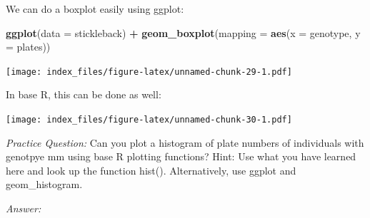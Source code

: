 \documentclass[]{article}
\newenvironment{Shaded}{\begin{snugshade}}{\end{snugshade}}
\newcommand{\DataTypeTok}[1]{\textcolor[rgb]{0.13,0.29,0.53}{#1}}
\newcommand{\KeywordTok}[1]{\textcolor[rgb]{0.13,0.29,0.53}{\textbf{#1}}}
\newcommand{\NormalTok}[1]{#1}
\newcommand{\OperatorTok}[1]{\textcolor[rgb]{0.81,0.36,0.00}{\textbf{#1}}}
\newcommand{\StringTok}[1]{\textcolor[rgb]{0.31,0.60,0.02}{#1}}
\begin{document}
We can do a boxplot easily using ggplot:

\begin{Shaded}
\begin{Highlighting}[]
\KeywordTok{ggplot}\NormalTok{(}\DataTypeTok{data =}\NormalTok{ stickleback) }\OperatorTok{+}\StringTok{ }
\StringTok{  }\KeywordTok{geom_boxplot}\NormalTok{(}\DataTypeTok{mapping =} \KeywordTok{aes}\NormalTok{(}\DataTypeTok{x =}\NormalTok{ genotype, }\DataTypeTok{y =}\NormalTok{ plates))}
\end{Highlighting}
\end{Shaded}

\texttt{[image: index\_files/figure-latex/unnamed-chunk-29-1.pdf]}

In base R, this can be done as well:

\begin{Shaded}
\end{Shaded}

\texttt{[image: index\_files/figure-latex/unnamed-chunk-30-1.pdf]}

\emph{Practice Question:} Can you plot a histogram of plate numbers of
individuals with genotpye mm using base R plotting functions? Hint: Use
what you have learned here and look up the function hist().
Alternatively, use ggplot and geom\_histogram.

\emph{Answer:}

\begin{Shaded}
\end{Shaded}
\end{document}
